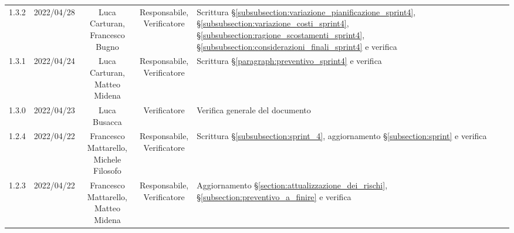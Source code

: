 \begin{center}
\begin{longtable}[c]{c | c | c | c | p{5cm}}
		1.3.2                                                      & 2022/04/28 & \Shortunderstack{Luca Carturan,                                                                                                                                                                     \\Francesco Bugno} & \Shortunderstack{Responsabile,\\Verificatore} & Scrittura §\ref{subsubsection:variazione_pianificazione_sprint4}, §\ref{subsubsection:variazione_costi_sprint4}, §\ref{subsubsection:ragione_scostamenti_sprint4}, §\ref{subsubsection:considerazioni_finali_sprint4} e verifica\\
		1.3.1                                                      & 2022/04/24 & \Shortunderstack{Luca Carturan,                                                                                                                                                                     \\Matteo Midena} & \Shortunderstack{Responsabile,\\Verificatore} & Scrittura §\ref{paragraph:preventivo_sprint4} e verifica\\
		1.3.0                                                      & 2022/04/23 & Luca Busacca                           & Verificatore   & Verifica generale del documento                                                                                                           \\
		1.2.4                                                      & 2022/04/22 & \Shortunderstack{Francesco Mattarello,                                                                                                                                                              \\Michele Filosofo} & \Shortunderstack{Responsabile,\\Verificatore} & Scrittura §\ref{subsubsection:sprint_4}, aggiornamento §\ref{subsection:sprint} e verifica\\
		1.2.3                                                      & 2022/04/22 & \Shortunderstack{Francesco Mattarello,                                                                                                                                                              \\Matteo Midena} & \Shortunderstack{Responsabile,\\Verificatore} & Aggiornamento §\ref{section:attualizzazione_dei_rischi}, §\ref{subsection:preventivo_a_finire} e verifica\\

\end{longtable}
\end{center}
